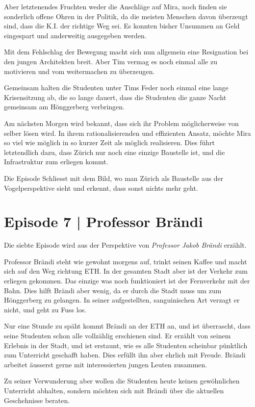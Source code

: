 \documentclass[11pt,a4paper,ngerman]{scrreprt}
\begin{document}
Aber letztenendes Fruchten weder die Anschläge auf Mira, noch finden sie
sonderlich offene Ohren in der Politik, da die meisten Menschen davon überzeugt
sind, dass die K.I. der richtige Weg sei. Es konnten bisher Unsummen an Geld
eingespart und anderweitig ausgegeben werden.

Mit dem Fehlschlag der Bewegung macht sich nun allgemein eine Resignation bei
den jungen Architekten breit. Aber Tim vermag es noch einmal alle zu motivieren
und vom weitermachen zu überzeugen.

Gemeinsam halten die Studenten unter Tims Feder noch einmal eine lange
Krisensitzung ab, die so lange dauert, dass die Studenten die ganze Nacht
gemeinsam am Hönggerberg verbringen.

Am nächsten Morgen wird bekannt, dass sich ihr Problem möglicherweise von selber
lösen wird. In ihrem rationalisierenden und effizienten Ansatz, möchte Mira so
viel wie möglich in so kurzer Zeit als möglich realisieren. Dies führt
letztendlich dazu, dass Zürich nur noch eine einzige Baustelle ist, und die
Infrastruktur zum erliegen kommt.

Die Episode Schliesst mit dem Bild, wo man Zürich als Baustelle aus der
Vogelperspektive sieht und erkennt, dass sonst nichts mehr geht.

\section*{Episode 7 | Professor Brändi}

Die siebte Episode wird aus der Perspektive von \emph{Professor Jakob Brändi} erzählt.

Professor Brändi steht wie gewohnt morgens auf, trinkt seinen Kaffee und macht
sich auf den Weg richtung ETH. In der gesamten Stadt aber ist der Verkehr zum
erliegen gekommen. Das einzige was noch funktioniert ist der Fernverkehr mit der
Bahn. Dies hilft Brändi aber wenig, da er durch die Stadt muss um zum
Hönggerberg zu gelangen. In seiner aufgestellten, sanguinischen Art verzagt er
nicht, und geht zu Fuss los.

Nur eine Stunde zu späht kommt Brändi an der ETH an, und ist überrascht, dass
seine Studenten schon alle vollzählig erschienen sind. Er erzählt von seinem
Erlebnis in der Stadt, und ist erstaunt, wie es alle Studenten scheinbar
pünktlich zum Unterricht geschafft haben. Dies erfüllt ihn aber ehrlich mit
Freude. Brändi arbeitet äusserst gerne mit interessierten jungen Leuten
zusammen.

Zu seiner Verwunderung aber wollen die Studenten heute keinen gewöhnlichen
Unterricht abhalten, sondern möchten sich mit Brändi über die aktuellen
Geschehnisse beraten.
\end{document}
